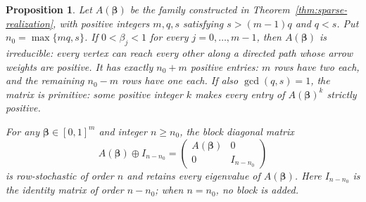 \documentclass[11pt,a4paper]{article}
\newtheorem{proposition}[theorem]{Proposition}
\theoremstyle{definition}
\theoremstyle{remark}
\numberwithin{equation}{section}
\begin{document}
\begin{proposition}\label{prop:family-structure}
Let $A(\boldsymbol\beta)$ be the family constructed in Theorem~\ref{thm:sparse-realization}, with positive integers $m,q,s$ satisfying $s>(m-1)q$ and $q<s$. Put $n_0=\max\{mq,s\}$.
If $0<\beta_j<1$ for every $j=0,\ldots,m-1$, then $A(\boldsymbol\beta)$ is irreducible: every vertex can reach every other along a directed path whose arrow weights are positive. It has exactly $n_0+m$ positive entries: $m$ rows have two each, and the remaining $n_0-m$ rows have one each.
If also $\gcd(q,s)=1$, the matrix is primitive: some positive integer $k$ makes every entry of $A(\boldsymbol\beta)^k$ strictly positive.

For any $\boldsymbol\beta\in[0,1]^m$ and integer $n\ge n_0$, the block diagonal matrix
\[
 A(\boldsymbol\beta)\oplus I_{n-n_0}
 =\begin{pmatrix}
 A(\boldsymbol\beta)&0\\
 0&I_{n-n_0}
 \end{pmatrix}
\]
is row-stochastic of order $n$ and retains every eigenvalue of $A(\boldsymbol\beta)$. Here $I_{n-n_0}$ is the identity matrix of order $n-n_0$; when $n=n_0$, no block is added.
\end{proposition}
\end{document}
